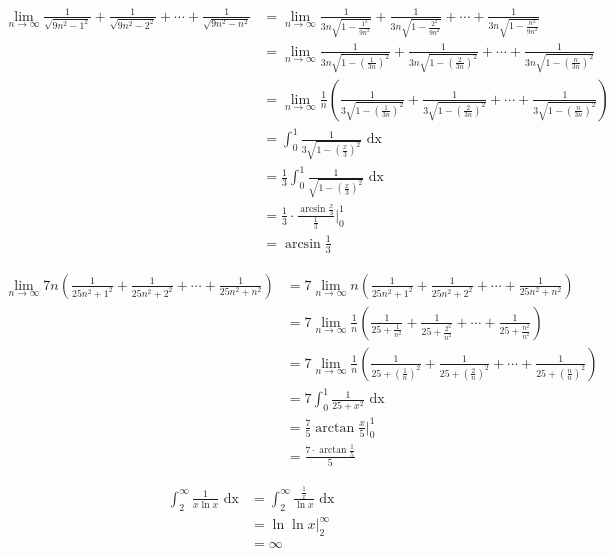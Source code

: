 \documentclass[a4paper,12pt]{article}
\newcommand{\?}{\stackrel{?}{=}}
\begin{document}
\begin{my_example}
\begin{align*}
  \lim_{n\to\infty} \frac{1}{\sqrt{9n^2-1^2}} + \frac{1}{\sqrt{9n^2-2^2}} + \cdots + \frac{1}{\sqrt{9n^2-n^2}} &= \lim_{n\to\infty} \frac{1}{3n\sqrt{1-\frac{1^2}{9n^2}}} + \frac{1}{3n\sqrt{1-\frac{2^2}{9n^2}}} + \cdots + \frac{1}{3n\sqrt{1-\frac{n^2}{9n^2}}}\\
  &= \lim_{n\to\infty} \frac{1}{3n\sqrt{1-\left(\frac{1}{3n}\right)^2}} + \frac{1}{3n\sqrt{1-\left(\frac{2}{3n}\right)^2}} + \cdots + \frac{1}{3n\sqrt{1-\left(\frac{n}{3n}\right)^2}}\\
  &= \lim_{n\to\infty} \frac1n\left(\frac{1}{3\sqrt{1-\left(\frac{1}{3n}\right)^2}} + \frac{1}{3\sqrt{1-\left(\frac{2}{3n}\right)^2}} + \cdots + \frac{1}{3\sqrt{1-\left(\frac{n}{3n}\right)^2}}\right)\\
  &= \int_0^1 \frac{1}{3\sqrt{1-\left(\frac{x}{3}\right)^2}} \text{ dx}\\
  &= \frac13 \int_0^1 \frac{1}{\sqrt{1-\left(\frac{x}{3}\right)^2}} \text{ dx}\\
  &= \frac13 \cdot \frac{\arcsin{\frac{x}{3}}}{\frac13} \Bigg|_0^1\\
  &= \arcsin{\frac13}
\end{align*}
\end{my_example}
\begin{my_example}
\begin{align*}
  \lim_{n\to\infty} 7n\left(\frac{1}{25n^2 + 1^2} + \frac{1}{25n^2 + 2^2} + \cdots + \frac{1}{25n^2 + n^2}\right) &= 7\lim_{n\to\infty} n\left(\frac{1}{25n^2 + 1^2} + \frac{1}{25n^2 + 2^2} + \cdots + \frac{1}{25n^2 + n^2}\right)\\
  &= 7\lim_{n\to\infty} \frac1n\left(\frac{1}{25 + \frac{1}{n^2}} + \frac{1}{25 + \frac{2^2}{n^2}} + \cdots + \frac{1}{25 + \frac{n^2}{n^2}}\right)\\
  &= 7\lim_{n\to\infty} \frac1n\left(\frac{1}{25 + \left(\frac{1}{n}\right)^2} + \frac{1}{25 + \left(\frac{2}{n}\right)^2} + \cdots + \frac{1}{25 + \left(\frac{n}{n}\right)^2}\right)\\
  &= 7\int_0^1 \frac{1}{25+x^2} \text{ dx}\\
  &= \frac75 \arctan{\frac{x}{5}} \Big|_0^1\\
  &= \frac{7 \cdot \arctan{\frac15}}{5}
\end{align*}
\end{my_example}
\begin{my_example}
\begin{align*}
  \int_2^\infty \frac{1}{x\ln x} \text{ dx} &= \int_2^\infty \frac{\frac1x}{\ln x} \text{ dx}\\
  &= \ln{\ln x} \Big|_2^\infty\\
  &= \infty
\end{align*}
\end{my_example}
\end{document}
